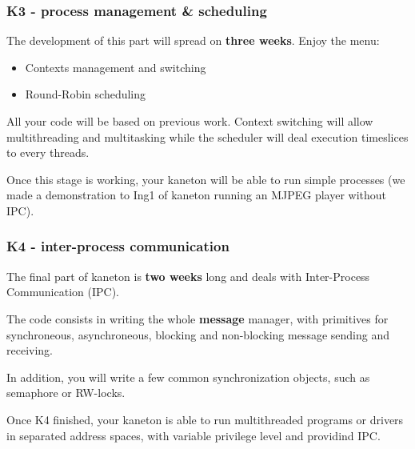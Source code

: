 
\begin{frame}
  \frametitle{K3 - process management \& scheduling}

  The development of this part will spread on \textbf{three
  weeks}. Enjoy the menu:

  \begin{itemize}
  \item
    Contexts management and switching
  \item
    Round-Robin scheduling
  \end{itemize}

  \-

  All your code will be based on previous work. Context switching will
  allow multithreading and multitasking while the scheduler will deal
  execution timeslices to every threads.

  \-

  Once this stage is working, your kaneton will be able to run simple
  processes (we made a demonstration to Ing1 of kaneton running an
  MJPEG player without IPC).

\end{frame}


\begin{frame}
  \frametitle{K4 - inter-process communication}

  The final part of kaneton is \textbf{two weeks} long and deals with
  Inter-Process Communication (IPC).

  \-

  The code consists in writing the whole \textbf{message} manager,
  with primitives for synchroneous, asynchroneous, blocking and
  non-blocking message sending and receiving.

  \-

  In addition, you will write a few common synchronization objects,
  such as semaphore or RW-locks.

  \-

  Once K4 finished, your kaneton is able to run multithreaded programs
  or drivers in separated address spaces, with variable privilege
  level and providind IPC.

\end{frame}


